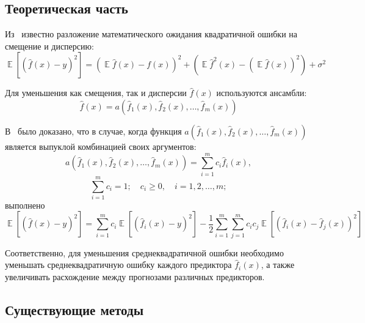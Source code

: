 \documentclass[12pt, fleqn]{article}
\newcommand{\expectation}{\mathop{\mathbb{E}}}
\newcommand{\predictionfunction}{\hat{f}}
\newcommand{\ensemblefunction}{a}
\newcommand{\numberpredictionfunctions}{m}
\newcommand{\for}[3]{\sum\limits_{#1 = #2}^{#3}}  %
\newcommand{\forn}[2]{\for{#1}{1}{#2}}  %
\newcommand{\many}[3]{#1 1 #2, #1 2 #2, \dots, #1 #3 #2}  %
\newcommand{\ensemblefunctionfull}{\ensemblefunction(\many{\predictionfunction_}{(x)}{\numberpredictionfunctions})}
\begin{document}
\subsection{Теоретическая часть}
Из~\cite{BiasVarianceDecompositionZeroOneSquaredLoss} известно разложение математического ожидания квадратичной ошибки на смещение и дисперсию:
\begin{equation*}
\expectation \left[ \left( \predictionfunction(x) - y \right)^2 \right] =
\left(
	\expectation \predictionfunction(x) - f(x)
\right)^2  +
\left(
	\expectation \predictionfunction^2(x) - \left(\expectation \predictionfunction(x)\right)^2
\right) + \sigma^2
\end{equation*}

Для уменьшения как смещения, так и дисперсии $\predictionfunction(x)$ используются ансамбли:
\begin{equation*}
\predictionfunction(x) = \ensemblefunctionfull
\end{equation*}

В~\cite{OptimalConvexCorrectingProcedures} было доказано, что в случае, когда функция $\ensemblefunctionfull$ является выпуклой комбинацией своих аргументов:
\begin{equation*}
\ensemblefunctionfull = 
\forn{i}{\numberpredictionfunctions} c_i \predictionfunction_i(x),
\end{equation*}
\begin{equation*}
\forn{i}{\numberpredictionfunctions} c_i = 1; \quad c_i \geq 0, \quad i = \many{}{}{\numberpredictionfunctions};
\end{equation*}
выполнено
\begin{equation}\label{OptimizedDifferenceDecomposition}
\expectation \left[\left( \predictionfunction(x) - y \right)^2 \right] =
\forn{i}{\numberpredictionfunctions} c_i
\expectation \left[ \left(
	\predictionfunction_i(x) - y
\right)^2 \right] 
- \dfrac{1}{2}
\forn{i}{\numberpredictionfunctions} \forn{j}{\numberpredictionfunctions} c_i c_j
\expectation \left[ \left(
	\predictionfunction_i(x) - \predictionfunction_j(x)
\right)^2 \right]
\end{equation}

Соответственно, для уменьшения среднеквадратичной ошибки необходимо уменьшать среднеквадратичную ошибку каждого предиктора $\predictionfunction_i(x)$, а также увеличивать расхождение между прогнозами различных предикторов.

\subsection{Существующие методы}
\end{document}
